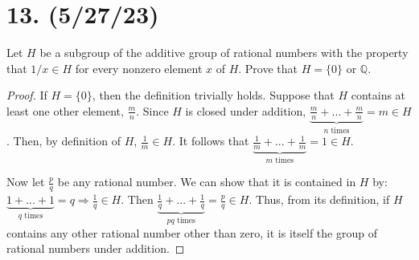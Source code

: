 \documentclass{article}
\begin{document}
\section*{13. (5/27/23)}

Let $H$ be a subgroup of the additive group of rational numbers with the property that $1/x \in H$ for every nonzero element $x$ of $H$. Prove that $H = \{ 0 \}$ or $\mathbb{Q}$.

\begin{proof}
    If $H = \{ 0 \}$, then the definition trivially holds. Suppose that $H$ contains at least one other element, $\frac{m}{n}$. Since $H$ is closed under addition, $\underbrace{\frac{m}{n} + ... + \frac{m}{n}}_{n \text{ times}} = m \in H$. Then, by definition of $H$, $\frac{1}{m} \in H$. It follows that $\underbrace{\frac{1}{m} + ... + \frac{1}{m}}_{m \text{ times}} = 1 \in H$.

    Now let $\frac{p}{q}$ be any rational number. We can show that it is contained in $H$ by: $\underbrace{1 + ... + 1}_{q \text{ times}} = q \Rightarrow \frac{1}{q} \in H$. Then $\underbrace{\frac{1}{q} + ... + \frac{1}{q}}_{pq \text{ times}} = \frac{p}{q} \in H$. Thus, from its definition, if $H$ contains any other rational number other than zero, it is itself the group of rational numbers under addition.
\end{proof}
\end{document}
